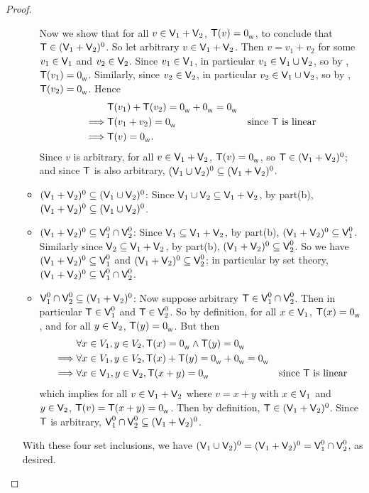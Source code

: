 \begin{proof}
\begin{enumerate}
\begin{itemize}
        Now we show that for all \(v \in \textsf{V}_1 + \textsf{V}_2\), \(\textsf{T}(v) = 0_{_{\textsf{W}}}\), to conclude that \(\textsf{T} \in (\textsf{V}_1 + \textsf{V}_2)^0\).
        So let arbitrary \(v \in \textsf{V}_1 + \textsf{V}_2\).
        Then \(v = v_1 + v_2\) for some \(v_1 \in \textsf{V}_1\) and \(v_2 \in \textsf{V}_2\).
        Since \(v_1 \in \textsf{V}_1\), in particular \(v_1 \in \textsf{V}_1 \cup \textsf{V}_2\), so by , \(\textsf{T}(v_1) = 0_{_{\textsf{W}}}\).
        Similarly, since \(v_2 \in \textsf{V}_2\), in particular \(v_2 \in \textsf{V}_1 \cup \textsf{V}_2\), so by , \(\textsf{T}(v_2) = 0_{_{\textsf{W}}}\).
        Hence
        \begin{align*}
                     & \textsf{T}(v_1) + \textsf{T}(v_2) = 0_{_{\textsf{W}}} + 0_{_{\textsf{W}}} = 0_{_{\textsf{W}}} \\
            \implies & \textsf{T}(v_1 + v_2) = 0_{_{\textsf{W}}} & \text{since \(\textsf{T}\) is linear} \\
            \implies & \textsf{T}(v) = 0_{_{\textsf{W}}}.
        \end{align*}
        Since \(v\) is arbitrary, for all \(v \in \textsf{V}_1 + \textsf{V}_2\), \(\textsf{T}(v) = 0_{_{\textsf{W}}}\), so \(\textsf{T} \in (\textsf{V}_1 + \textsf{V}_2)^0\);
        and since \(\textsf{T}\) is also arbitrary, \((\textsf{V}_1 \cup \textsf{V}_2)^0 \subseteq (\textsf{V}_1 + \textsf{V}_2)^0\).
    \item \((\textsf{V}_1 + \textsf{V}_2)^0 \subseteq (\textsf{V}_1 \cup \textsf{V}_2)^0\):
        Since \(\textsf{V}_1 \cup \textsf{V}_2 \subseteq \textsf{V}_1 + \textsf{V}_2\), by part(b), \((\textsf{V}_1 + \textsf{V}_2)^0 \subseteq (\textsf{V}_1 \cup \textsf{V}_2)^0\).
    \item \((\textsf{V}_1 + \textsf{V}_2)^0 \subseteq \textsf{V}_1^0 \cap \textsf{V}_2^0\):
        Since \(\textsf{V}_1 \subseteq \textsf{V}_1 + \textsf{V}_2\), by part(b), \((\textsf{V}_1 + \textsf{V}_2)^0 \subseteq \textsf{V}_1^0\).
        Similarly since \(\textsf{V}_2 \subseteq \textsf{V}_1 + \textsf{V}_2\), by part(b), \((\textsf{V}_1 + \textsf{V}_2)^0 \subseteq \textsf{V}_2^0\).
        So we have \((\textsf{V}_1 + \textsf{V}_2)^0 \subseteq \textsf{V}_1^0\) and \((\textsf{V}_1 + \textsf{V}_2)^0 \subseteq \textsf{V}_2^0\);
        in particular by set theory, \((\textsf{V}_1 + \textsf{V}_2)^0 \subseteq \textsf{V}_1^0 \cap \textsf{V}_2^0\).
    \item \(\textsf{V}_1^0 \cap \textsf{V}_2^0 \subseteq (\textsf{V}_1 + \textsf{V}_2)^0\):
        Now suppose arbitrary \(\textsf{T} \in \textsf{V}_1^0 \cap \textsf{V}_2^0\).
        Then in particular \(\textsf{T} \in \textsf{V}_1^0\) and \(\textsf{T} \in \textsf{V}_2^0\).
        So by definition, for all \(x \in \textsf{V}_1\), \(\textsf{T}(x) = 0_{_{\textsf{W}}}\), and for all \(y \in \textsf{V}_2\), \(\textsf{T}(y) = 0_{_{\textsf{W}}}\).
        But then
        \begin{align*}
                     & \forall x \in V_1, y \in V_2, \textsf{T}(x) = 0_{_{\textsf{W}}} \land \textsf{T}(y) = 0_{_{\textsf{W}}} \\
            \implies & \forall x \in V_1, y \in V_2, \textsf{T}(x) + \textsf{T}(y) = 0_{_{\textsf{W}}} + 0_{_{\textsf{W}}} = 0_{_{\textsf{W}}} \\
            \implies & \forall x \in \textsf{V}_1, y \in \textsf{V}_2, \textsf{T}(x + y) = 0_{_{\textsf{W}}} & \text{since \(\textsf{T}\) is linear}
        \end{align*}
        which implies for all \(v \in \textsf{V}_1 + \textsf{V}_2\) where \(v = x + y\) with \(x \in \textsf{V}_1\) and \(y \in \textsf{V}_2\), \(\textsf{T}(v) = \textsf{T}(x + y) = 0_{_{\textsf{W}}}\).
        Then by definition, \(\textsf{T} \in (\textsf{V}_1 + \textsf{V}_2)^0\).
        Since \(\textsf{T}\) is arbitrary, \(\textsf{V}_1^0 \cap \textsf{V}_2^0 \subseteq (\textsf{V}_1 + \textsf{V}_2)^0\).
\end{itemize}

With these four set inclusions, we have \((\textsf{V}_1 \cup \textsf{V}_2)^0 = (\textsf{V}_1 + \textsf{V}_2)^0 = \textsf{V}_1^0 \cap \textsf{V}_2^0\), as desired.
\end{enumerate}
\end{proof}

